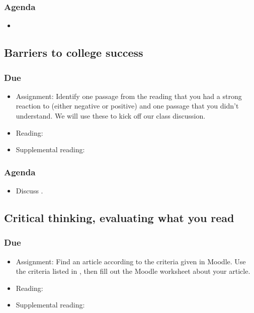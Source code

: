 \documentclass[12pt,article,oneside]{memoir}
\begin{document}
\subsubsection{Agenda}
\begin{itemize}
\item 
\end{itemize} 

\subsection{Barriers to college success}
\subsubsection{Due}
\begin{itemize}
 \item Assignment: Identify one passage from the reading that you had a strong reaction to (either negative or positive) and one passage that you didn't understand.  We will use these to kick off our class discussion.
 \item Reading: \cite{guillory2008s}
 \item Supplemental reading: \cite{rosenberg}
\end{itemize}

\subsubsection{Agenda}
\begin{itemize}
\item Discuss \cite{guillory2008s}.
\end{itemize}



\subsection{Critical thinking, evaluating what you read}
\subsubsection{Due}
\begin{itemize}
 \item Assignment: Find an article according to the criteria given in Moodle.  Use the criteria listed in \cite{evaluation}, then fill out the Moodle worksheet about your article.
 \item Reading: \cite{evaluation}
 \item Supplemental reading:
\end{itemize}
\end{document}
